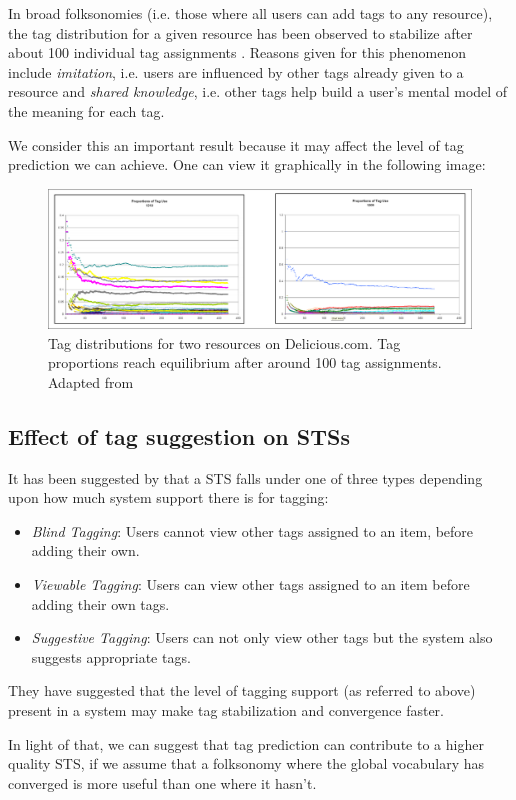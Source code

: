 In broad folksonomies (i.e. those where all users can add tags to any resource), the tag distribution for a given resource has been observed to stabilize after about 100 individual tag assignments \citep{golder_huberman_2006}. Reasons given for this phenomenon include \textit{imitation}, i.e. users are influenced by other tags already given to a resource and \textit{shared knowledge}, i.e. other tags help build a user's mental model of the meaning for each tag.

We consider this an important result because it may affect the level of tag prediction we can achieve. One can view it graphically in the following image:

\begin{figure}[!h]
    \centering
    \includegraphics[width=\textwidth]{chapters/02_social_tagging/images/golder_huberman.png}
    \caption{Tag distributions for two resources on Delicious.com. Tag proportions reach equilibrium after around 100 tag assignments. Adapted from \cite{golder_huberman_2005}}
    \label{fig:golder_huberman}
\end{figure}

\subsection{Effect of tag suggestion on STSs}

It has been suggested by \cite{marlow_etal_2006} that a STS falls under one of three types depending upon how much system support there is for tagging:

\begin{itemize}[noitemsep]
\item \textit{Blind Tagging}: Users cannot view other tags assigned to an item, before adding their own.
\item \textit{Viewable Tagging}: Users can view other tags assigned to an item before adding their own tags.
\item \textit{Suggestive Tagging}: Users can not only view other tags but the system also suggests appropriate tags.\citep{marlow_etal_2006}
\end{itemize}

They have suggested that the level of tagging support (as referred to above) present in a system may make tag stabilization and convergence faster.

In light of that, we can suggest that tag prediction can contribute to a higher quality STS, if we assume that a folksonomy where the global vocabulary has converged is more useful than one where it hasn't.


